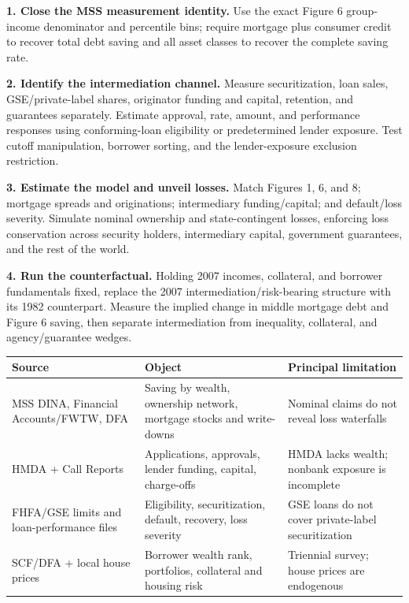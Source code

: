 \textbf{1. Close the MSS measurement identity.}
Use the exact Figure 6 group-income denominator and percentile bins; require
mortgage plus consumer credit to recover total debt saving and all asset classes
to recover the complete saving rate.

\textbf{2. Identify the intermediation channel.}
Measure securitization, loan sales, GSE/private-label shares, originator funding
and capital, retention, and guarantees separately. Estimate approval, rate,
amount, and performance responses using conforming-loan eligibility or
predetermined lender exposure. Test cutoff manipulation, borrower sorting, and
the lender-exposure exclusion restriction.

\textbf{3. Estimate the model and unveil losses.}
Match Figures 1, 6, and 8; mortgage spreads and originations; intermediary
funding/capital; and default/loss severity. Simulate nominal ownership and
state-contingent losses, enforcing loss conservation across security holders,
intermediary capital, government guarantees, and the rest of the world.

\textbf{4. Run the counterfactual.}
Holding 2007 incomes, collateral, and borrower fundamentals fixed, replace the
2007 intermediation/risk-bearing structure with its 1982 counterpart. Measure
the implied change in middle mortgage debt and Figure 6 saving, then separate
intermediation from inequality, collateral, and agency/guarantee wedges.


\begin{tabularx}{\textwidth}{@{}L{1.65in}X L{1.75in}@{}}
\toprule
\textbf{Source} & \textbf{Object} & \textbf{Principal limitation} \\
\midrule
MSS DINA, Financial Accounts/FWTW, DFA
& Saving by wealth, ownership network, mortgage stocks and write-downs
& Nominal claims do not reveal loss waterfalls \\
HMDA + Call Reports
& Applications, approvals, lender funding, capital, charge-offs
& HMDA lacks wealth; nonbank exposure is incomplete \\
FHFA/GSE limits and loan-performance files
& Eligibility, securitization, default, recovery, loss severity
& GSE loans do not cover private-label securitization \\
SCF/DFA + local house prices
& Borrower wealth rank, portfolios, collateral and housing risk
& Triennial survey; house prices are endogenous \\
\bottomrule
\end{tabularx}

